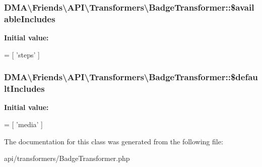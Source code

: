 \subsubsection[{\$available\+Includes}]{\setlength{\rightskip}{0pt plus 5cm}D\+M\+A\textbackslash{}\+Friends\textbackslash{}\+A\+P\+I\textbackslash{}\+Transformers\textbackslash{}\+Badge\+Transformer\+::\$available\+Includes\hspace{0.3cm}{\ttfamily [protected]}}\label{classDMA_1_1Friends_1_1API_1_1Transformers_1_1BadgeTransformer_aa5844dd12d509abc5bbbde77a5050e0f}
{\bfseries Initial value\+:}
\begin{DoxyCode}
= [
            \textcolor{stringliteral}{'steps'}
    ]
\end{DoxyCode}
\hypertarget{classDMA_1_1Friends_1_1API_1_1Transformers_1_1BadgeTransformer_a82e69be5fd5e311fb322efa0a9a5958c}{}
\subsubsection[{\$default\+Includes}]{\setlength{\rightskip}{0pt plus 5cm}D\+M\+A\textbackslash{}\+Friends\textbackslash{}\+A\+P\+I\textbackslash{}\+Transformers\textbackslash{}\+Badge\+Transformer\+::\$default\+Includes\hspace{0.3cm}{\ttfamily [protected]}}\label{classDMA_1_1Friends_1_1API_1_1Transformers_1_1BadgeTransformer_a82e69be5fd5e311fb322efa0a9a5958c}
{\bfseries Initial value\+:}
\begin{DoxyCode}
= [
             \textcolor{stringliteral}{'media'}
     ]
\end{DoxyCode}


The documentation for this class was generated from the following file\+:\begin{DoxyCompactItemize}
\item 
api/transformers/Badge\+Transformer.\+php\end{DoxyCompactItemize}
